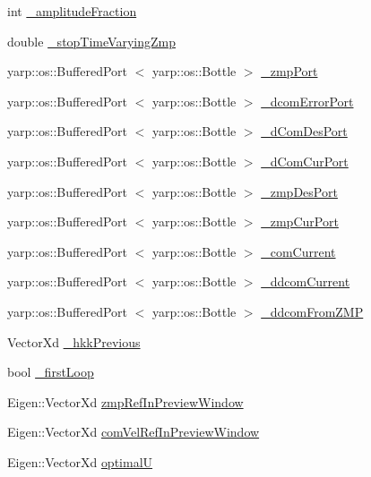 \begin{DoxyCompactItemize}
int \hyperlink{classWalkingClient_ac548ce03ea9ceffb4b42981942f66dd0}{\-\_\-amplitude\-Fraction}
\item 
double \hyperlink{classWalkingClient_a2ed3837afa0c366f1cdef16b2a99b761}{\-\_\-stop\-Time\-Varying\-Zmp}
\item 
yarp\-::os\-::\-Buffered\-Port\*
$<$ yarp\-::os\-::\-Bottle $>$ \hyperlink{classWalkingClient_af2e0817fa94ca802775addd22b09bf7a}{\-\_\-zmp\-Port}
\item 
yarp\-::os\-::\-Buffered\-Port\*
$<$ yarp\-::os\-::\-Bottle $>$ \hyperlink{classWalkingClient_a1b01264c9d9d403a68a149d86d1bc53f}{\-\_\-dcom\-Error\-Port}
\item 
yarp\-::os\-::\-Buffered\-Port\*
$<$ yarp\-::os\-::\-Bottle $>$ \hyperlink{classWalkingClient_a17369473b4fe2ff0eaecc7d41a8430c7}{\-\_\-d\-Com\-Des\-Port}
\item 
yarp\-::os\-::\-Buffered\-Port\*
$<$ yarp\-::os\-::\-Bottle $>$ \hyperlink{classWalkingClient_a1fbc9d7f1e967f24acda745028f865df}{\-\_\-d\-Com\-Cur\-Port}
\item 
yarp\-::os\-::\-Buffered\-Port\*
$<$ yarp\-::os\-::\-Bottle $>$ \hyperlink{classWalkingClient_acbac3e142471448b50dd605e4217b0d0}{\-\_\-zmp\-Des\-Port}
\item 
yarp\-::os\-::\-Buffered\-Port\*
$<$ yarp\-::os\-::\-Bottle $>$ \hyperlink{classWalkingClient_a546e6830e43d19ba7d8a8e808e28ef53}{\-\_\-zmp\-Cur\-Port}
\item 
yarp\-::os\-::\-Buffered\-Port\*
$<$ yarp\-::os\-::\-Bottle $>$ \hyperlink{classWalkingClient_a199a104e0d4d52deae07d88d8229b60d}{\-\_\-com\-Current}
\item 
yarp\-::os\-::\-Buffered\-Port\*
$<$ yarp\-::os\-::\-Bottle $>$ \hyperlink{classWalkingClient_a692d95b3e76a396d107b0c29a3d591f1}{\-\_\-ddcom\-Current}
\item 
yarp\-::os\-::\-Buffered\-Port\*
$<$ yarp\-::os\-::\-Bottle $>$ \hyperlink{classWalkingClient_a41b7320607812418af496b8b2c30204f}{\-\_\-ddcom\-From\-Z\-M\-P}
\item 
\-Vector\-Xd \hyperlink{classWalkingClient_abc3c504305c00a27e9fd38a8bf08ecda}{\-\_\-hkk\-Previous}
\item 
bool \hyperlink{classWalkingClient_ab645ecb2d55e28b57a64ca48ee638b1e}{\-\_\-first\-Loop}
\item 
\-Eigen\-::\-Vector\-Xd \hyperlink{classWalkingClient_af28b3cd3b1202f83e193b098572fbdd3}{zmp\-Ref\-In\-Preview\-Window}
\item 
\-Eigen\-::\-Vector\-Xd \hyperlink{classWalkingClient_ab3b1defedb6d79b5b6eaadd52bbad9f5}{com\-Vel\-Ref\-In\-Preview\-Window}
\item 
\-Eigen\-::\-Vector\-Xd \hyperlink{classWalkingClient_a0e5aee88e377029d79f57e778c583f18}{optimal\-U}
\end{DoxyCompactItemize}


